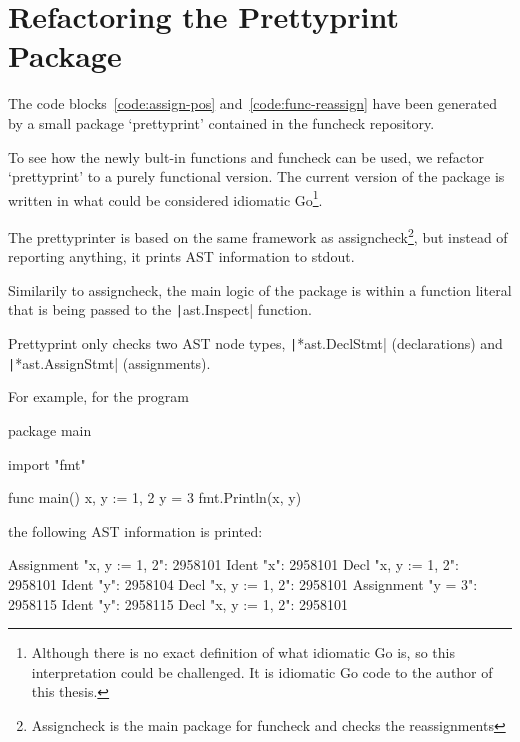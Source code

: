 
\section{Refactoring the Prettyprint Package}


The code blocks~\ref{code:assign-pos} and~\ref{code:func-reassign} have been
generated by a small package `prettyprint' contained in the funcheck repository.

To see how the newly bult-in functions and funcheck can be used, we refactor `prettyprint'
to a purely functional version.
The current version of the package is written in what could be considered idiomatic
Go\footnote{
	Although there is no exact definition of what idiomatic Go is, so this interpretation
	could be challenged. It is idiomatic Go code to the author of this thesis.
}. %


The prettyprinter is based on the same framework as assigncheck\footnote{Assigncheck
is the main package for funcheck and checks the reassignments}, but instead
of reporting anything, it prints AST information to \gls{stdout}.

Similarily to assigncheck, the main logic of the package is within a
function literal that is being passed to the \texttt|ast.Inspect|
function.

Prettyprint only checks two AST node types, \texttt|*ast.DeclStmt|
(declarations) and \texttt|*ast.AssignStmt| (assignments).

For example, for the program
\begin{gocode}
package main

import "fmt"

func main() {
	x, y := 1, 2
	y = 3
	fmt.Println(x, y)
}
\end{gocode}
the following AST information is printed:

\begin{gocode}
Assignment "x, y := 1, 2": 2958101
		Ident "x": 2958101
				Decl "x, y := 1, 2": 2958101
		Ident "y": 2958104
				Decl "x, y := 1, 2": 2958101
Assignment "y = 3": 2958115
		Ident "y": 2958115
				Decl "x, y := 1, 2": 2958101
\end{gocode}

